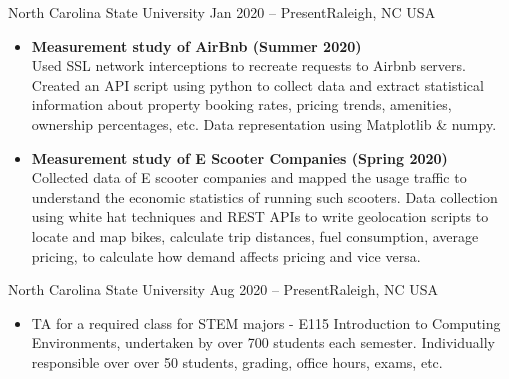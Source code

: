 \documentclass[10pt,a4paper]{altacv}
\begin{document}
        {North Carolina State University}
        {Jan 2020 -- Present}{Raleigh, NC USA}
\begin{itemize}
\item \textbf{Measurement study of AirBnb (Summer 2020)}\\
Used SSL network interceptions to recreate requests to Airbnb servers. Created an API script using python to collect data and extract statistical information about property booking rates, pricing trends, amenities, ownership percentages, etc. Data representation using Matplotlib & numpy.
\newline
\item \textbf{Measurement study of E Scooter Companies (Spring 2020)}\\
Collected data of E scooter companies and mapped the usage traffic to understand the economic statistics of running such scooters. Data collection using white hat techniques and REST APIs to write geolocation scripts to locate and map bikes, calculate trip distances, fuel consumption, average pricing, to calculate how demand affects pricing and vice versa. 
\end{itemize}
\divider

        {North Carolina State University}
        {Aug 2020 -- Present}{Raleigh, NC USA}
\begin{itemize}

\item TA for a required class for STEM majors - E115 Introduction to Computing
Environments, undertaken by over 700 students each semester. Individually
responsible over over 50 students, grading, office hours, exams, etc.
\end{itemize}
\end{document}
